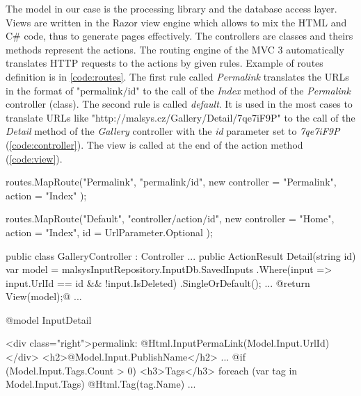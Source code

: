 
The model in our case is the \lsystem processing library and the database access layer.
Views are written in the Razor view engine which allows to mix the HTML and C\# code, thus to generate pages effectively.
The controllers are classes and theirs methods represent the actions.
The routing engine of the MVC 3 automatically translates HTTP requests to the actions by given rules.
Example of routes definition is in \autoref{code:routes}.
The first rule called \emph{Permalink} translates the URLs in the format of "permalink/{id}" to the call of the \emph{Index} method of the \emph{Permalink} controller (class).
The second rule is called \emph{default}.
It is used in the most cases to translate URLs like "http://malsys.cz/Gallery/Detail/7qe7iF9P" to the call of the \emph{Detail} method of the \emph{Gallery} controller with the \emph{id} parameter set to \emph{7qe7iF9P} (\autoref{code:controller}).
The view is called at the end of the action method (\autoref{code:view}).


\begin{Csharp}[label=code:routes,caption={Example of routes definition}]
routes.MapRoute("Permalink",
	"permalink/{id}",
	new { controller = "Permalink", action = "Index" }
);

routes.MapRoute("Default",
	 "{controller}/{action}/{id}",
	 new { controller = "Home", action = "Index", id = UrlParameter.Optional }
);
\end{Csharp}

\begin{Csharp}[label=code:controller,caption={The \emph{Detail} method of the \emph{Gallery} controller}]
public class GalleryController : Controller {
	...
	public ActionResult Detail(string id) {
		var model = malsysInputRepository.InputDb.SavedInputs
			.Where(input => input.UrlId == id && !input.IsDeleted)
			.SingleOrDefault();
		...
		@return View(model);@
	}
	...
}
\end{Csharp}

\begin{Razor}[label=code:view,caption={Gallery \emph{detail} view demonstrating the Razor syntax}]
@model InputDetail

<div class="right">permalink: @Html.InputPermaLink(Model.Input.UrlId)</div>
<h2>@Model.Input.PublishName</h2>
...
@if (Model.Input.Tags.Count > 0) {
	<h3>Tags</h3>
	foreach (var tag in Model.Input.Tags) {
		@Html.Tag(tag.Name)
	}
}
...
\end{Razor}


